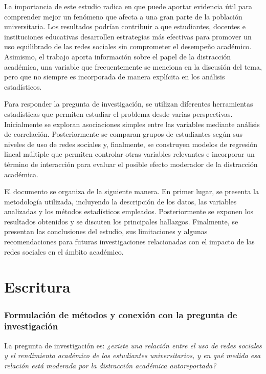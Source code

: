 \documentclass[12pt]{article}
\begin{document}
La importancia de este estudio radica en que puede aportar evidencia útil para comprender mejor un fenómeno que afecta a una gran parte de la población universitaria. Los resultados podrían contribuir a que estudiantes, docentes e instituciones educativas desarrollen estrategias más efectivas para promover un uso equilibrado de las redes sociales sin comprometer el desempeño académico. Asimismo, el trabajo aporta información sobre el papel de la distracción académica, una variable que frecuentemente se menciona en la discusión del tema, pero que no siempre es incorporada de manera explícita en los análisis estadísticos.

Para responder la pregunta de investigación, se utilizan diferentes herramientas estadísticas que permiten estudiar el problema desde varias perspectivas. Inicialmente se exploran asociaciones simples entre las variables mediante análisis de correlación. Posteriormente se comparan grupos de estudiantes según sus niveles de uso de redes sociales y, finalmente, se construyen modelos de regresión lineal múltiple que permiten controlar otras variables relevantes e incorporar un término de interacción para evaluar el posible efecto moderador de la distracción académica.

El documento se organiza de la siguiente manera. En primer lugar, se presenta la metodología utilizada, incluyendo la descripción de los datos, las variables analizadas y los métodos estadísticos empleados. Posteriormente se exponen los resultados obtenidos y se discuten los principales hallazgos. Finalmente, se presentan las conclusiones del estudio, sus limitaciones y algunas recomendaciones para futuras investigaciones relacionadas con el impacto de las redes sociales en el ámbito académico.

\section*{Escritura}

\subsubsection*{Formulación de métodos y conexión con la pregunta de investigación}

La pregunta de investigación es: \textit{¿existe una relación entre el uso de redes sociales y el rendimiento académico de los estudiantes universitarios, y en qué medida esa relación está moderada por la distracción académica autoreportada?}
\end{document}
